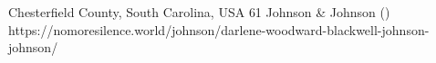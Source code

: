           {Chesterfield County, South Carolina, USA}
          {61}
          {Johnson \& Johnson }
          {}
          {
             ()
          }
          {https://nomoresilence.world/johnson/darlene-woodward-blackwell-johnson-johnson/}


